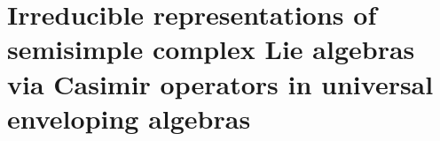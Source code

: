 

\section{Irreducible representations of semisimple complex Lie algebras via Casimir operators in universal enveloping algebras}
\setcounter{theorem}{0}
\setcounter{equation}{0}


\renewcommand{\theenumi}{\roman{enumi}}
\renewcommand{\labelenumi}{\textnormal{(\theenumi)}$\;\;$}


